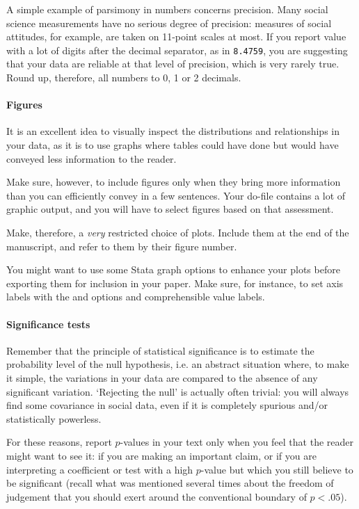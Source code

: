   A simple example of parsimony in numbers concerns precision. Many social science measurements have no serious degree of precision: measures of social attitudes, for example, are taken on 11-point scales at most. If you report value with a lot of digits after the decimal separator, as in \texttt{8.4759}, you are suggesting that your data are reliable at that level of precision, which is very rarely true. Round up, therefore, all numbers to 0, 1 or 2 decimals.%

\paragraph{Figures} It is an excellent idea to visually inspect the distributions and relationships in your data, as it is to use graphs where tables could have done but would have conveyed less information to the reader.%

  Make sure, however, to include figures only when they bring more information than you can efficiently convey in a few sentences. Your do-file contains a lot of graphic output, and you will have to select figures based on that assessment.%

  Make, therefore, a \emph{very} restricted choice of plots. Include them at the end of the manuscript, and refer to them by their figure number.%

  You might want to use some Stata graph options to enhance your plots before exporting them for inclusion in your paper. Make sure, for instance, to set axis labels with the  and  options and comprehensible value labels.%

\paragraph{Significance tests} Remember that the principle of statistical significance is to estimate the probability level of the null hypothesis, i.e. an abstract situation where, to make it simple, the variations in your data are compared to the absence of any significant variation. `Rejecting the null' is actually often trivial: you will always find some covariance in social data, even if it is completely spurious and/or statistically powerless.%

  For these reasons, report $p$-values in your text only when you feel that the reader might want to see it: if you are making an important claim, or if you are interpreting a coefficient or test with a high $p$-value but which you still believe to be significant (recall what was mentioned several times about the freedom of judgement that you should exert around the conventional boundary of $p < .05$).%

